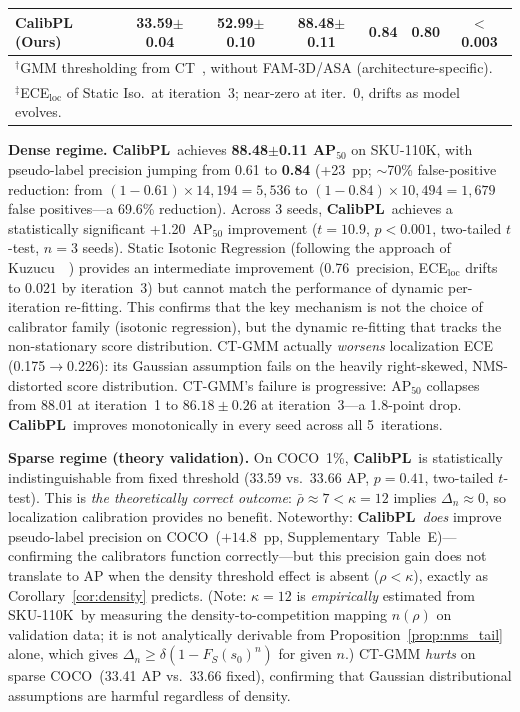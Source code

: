 \documentclass[10pt,twocolumn,letterpaper]{article}
\newcommand{\method}{\textbf{CalibPL}\xspace}
\newcommand{\coco}{\textsc{COCO}\xspace}
\newcommand{\sku}{\textsc{SKU-110K}\xspace}
\begin{document}
\begin{table}[t]
{\begin{tabular}{l|cc|cccc}
    \textbf{CalibPL (Ours)} & \textbf{33.59}\tiny{$\pm$0.04} & \textbf{52.99}\tiny{$\pm$0.10} & \textbf{88.48}\tiny{$\pm$0.11} & \textbf{0.84} & 0.80 & \textbf{$<$0.003} \\
    \bottomrule
    \multicolumn{7}{l}{\footnotesize $^\dagger$GMM thresholding from CT~\cite{consistentteacher2023}, without FAM-3D/ASA (architecture-specific).} \\
    \multicolumn{7}{l}{\footnotesize $^\ddagger$ECE$_\text{loc}$ of Static Iso.\ at iteration~3; near-zero at iter.~0, drifts as model evolves.}
  \end{tabular}}
  \label{tab:main}
  \vspace{-6pt}
\end{table}

\textbf{Dense regime.}
\method\ achieves \textbf{88.48$\pm$0.11 AP$_{50}$} on \sku, with
pseudo-label precision jumping from 0.61 to \textbf{0.84} (+23~pp;
$\sim$70\% false-positive reduction: from $(1{-}0.61)\times 14{,}194{=}5{,}536$
to $(1{-}0.84)\times 10{,}494{=}1{,}679$ false positives---a 69.6\% reduction).
Across 3 seeds, \method\ achieves a statistically significant +1.20~AP$_{50}$
improvement ($t{=}10.9$, $p{<}0.001$, two-tailed $t$-test, $n{=}3$ seeds).
Static Isotonic Regression (following the approach
of Kuzucu~\etal~\cite{kuzucu2024calibration}) provides an intermediate
improvement (0.76~precision, ECE$_\text{loc}$ drifts to 0.021 by iteration~3)
but cannot match the performance of dynamic per-iteration re-fitting. This
confirms that the key mechanism is not the choice of calibrator family (isotonic
regression), but the dynamic re-fitting that tracks the non-stationary score
distribution. CT-GMM actually \emph{worsens} localization ECE (0.175$\to$0.226):
its Gaussian assumption fails on the heavily right-skewed, NMS-distorted score
distribution. CT-GMM's failure is progressive: AP$_{50}$ collapses from 88.01
at iteration~1 to $\mathbf{86.18{\pm}0.26}$ at iteration~3---a 1.8-point drop.
\method\ improves monotonically in every seed across all 5~iterations.

\textbf{Sparse regime (theory validation).}
On \coco\ 1\%, \method\ is statistically indistinguishable from fixed threshold
(33.59 vs.\ 33.66 AP, $p{=}0.41$, two-tailed $t$-test). This is
\emph{the theoretically correct outcome}: $\bar{\rho}{\approx}7{<}\kappa{=}12$
implies $\Delta_n{\approx}0$, so localization calibration provides no benefit.
Noteworthy: \method\ \emph{does} improve pseudo-label precision on \coco\
($+14.8$~pp, Supplementary~Table~E)---confirming the calibrators function
correctly---but this precision gain does not translate to AP when the density
threshold effect is absent ($\rho{<}\kappa$), exactly as Corollary~\ref{cor:density}
predicts. (Note: $\kappa{=}12$ is \emph{empirically} estimated from \sku\ by
measuring the density-to-competition mapping $n(\rho)$ on validation data;
it is not analytically derivable from Proposition~\ref{prop:nms_tail} alone,
which gives $\Delta_n{\ge}\delta(1-F_S(s_0)^n)$ for given $n$.) CT-GMM \emph{hurts} on sparse \coco\ (33.41 AP vs.\ 33.66 fixed),
confirming that Gaussian distributional assumptions are harmful regardless of
density.
\end{document}
